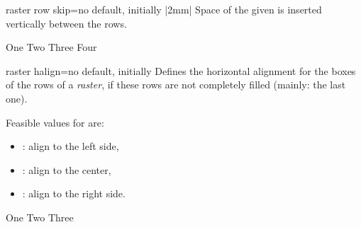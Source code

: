 \begin{docTcbKey}[][doc new=2014-11-10]{raster row skip}{=}{no default, initially |2mm|}
 Space of the given  is inserted vertically between the rows.
\begin{dispExample}
\begin{tcbitemize}[raster row skip=0pt,
  size=small,colframe=red!50!black,colback=red!10!white]
  \tcbitem One
  \tcbitem Two
  \tcbitem Three
  \tcbitem Four
\end{tcbitemize}
\end{dispExample}
\end{docTcbKey}

\clearpage

\begin{docTcbKey}[][doc new=2014-11-10]{raster halign}{=}{no default, initially }
  Defines the horizontal alignment for the boxes of the rows of a \emph{raster},
  if these rows are not completely filled (mainly: the last one).

  Feasible values for  are:
  \begin{itemize}
  \item{}: align to the left side,
  \item{}: align to the center,
  \item{}: align to the right side.
  \end{itemize}

\begin{dispExample}
\begin{tcbitemize}[raster halign=center,
  size=small,colframe=red!50!black,colback=red!10!white]
  \tcbitem One
  \tcbitem Two
  \tcbitem Three
\end{tcbitemize}
\end{dispExample}
\end{docTcbKey}


